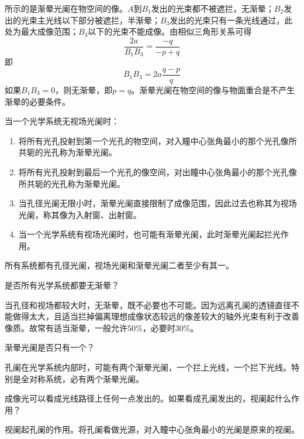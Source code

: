 \documentclass[cn,10pt,chinesefont=founder,math=mtpro2,cite=super,toc=onecol,twoside,openany]{elegantbook}
\begin{document}
 所示的是渐晕光阑在物空间的像。$A$到$B_1$发出的光束都不被遮拦，无渐晕；$B_2$发出的光束主光线以下部分被遮拦，半渐晕；$B_3$发出的光束只有一条光线通过，此处为最大成像范围；$B_3$以下的光束不能成像。由相似三角形关系可得
\begin{equation}
\frac{2a}{B_1B_3}=\frac{-q}{-p+q}
\end{equation}
即
\begin{equation}
B_1B_3=2a\frac{q-p}{q}
\end{equation}
如果$B_1B_3=0$，则无渐晕，即$p=q$。渐晕光阑在物空间的像与物面重合是不产生渐晕的必要条件。

\begin{note}当一个光学系统无视场光阑时：
	\begin{enumerate}
		\item 将所有光孔投射到第一个光孔的物空间，对入瞳中心张角最小的那个光孔像所共轭的光孔称为渐晕光阑。
		\item 将所有光孔投射到最后一个光孔的像空间，对出瞳中心张角最小的那个光孔像所共轭的光孔称为渐晕光阑。
		\item 当孔径光阑无限小时，渐晕光阑直接限制了成像范围，因此过去也称其为视场光阑，称其像为入射窗、出射窗。
		\item 当一个光学系统有视场光阑时，也可能有渐晕光阑，此时渐晕光阑起拦光作用。
	\end{enumerate}
\end{note}

\begin{remark}
	所有系统都有孔径光阑，视场光阑和渐晕光阑二者至少有其一。
\end{remark}

\begin{problem}
	是否所有光学系统都要无渐晕？
\end{problem}
\begin{solution}
	当孔径和视场都较大时，无渐晕，既不必要也不可能。因为远离孔阑的透镜直径不能做得太大，且适当拦掉偏离理想成像状态较远的像差较大的轴外光束有利于改善像质。故常有适当渐晕，一般允许$50\%$，必要时$30\%$。
\end{solution}

\begin{problem}
	渐晕光阑是否只有一个？
\end{problem}
\begin{solution}
	孔阑在光学系统内部时，可能有两个渐晕光阑，一个拦上光线，一个拦下光线。特别是全对称系统，必有两个渐晕光阑。
\end{solution}

\begin{problem}
	成像光可以看成光线路径上任何一点发出的。如果看成孔阑发出的，视阑起什么作用？
\end{problem}
\begin{solution}
	视阑起孔阑的作用。将孔阑看做光源，对入瞳中心张角最小的光阑是原来的视阑。
\end{solution}
\end{document}
